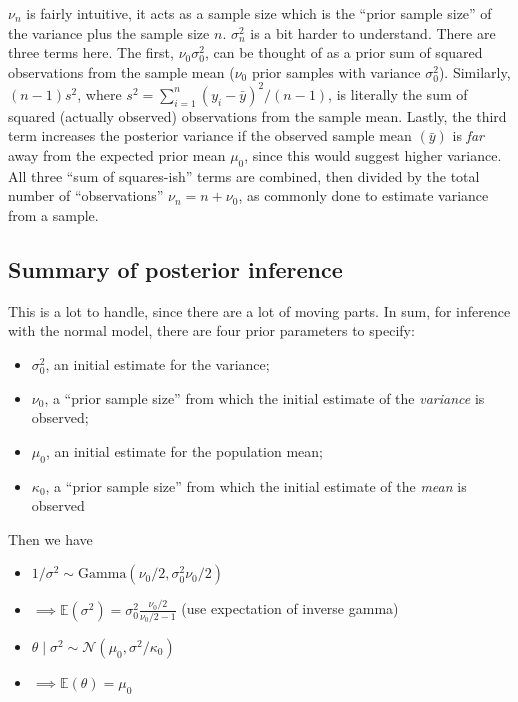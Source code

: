 \documentclass[]{article}
\providecommand{\tightlist}{%
  \setlength{\itemsep}{0pt}\setlength{\parskip}{0pt}}
\begin{document}
\(\nu_n\) is fairly intuitive, it acts as a sample size which is the
``prior sample size'' of the variance plus the sample size \(n\).
\(\sigma_n^2\) is a bit harder to understand. There are three terms
here. The first, \(\nu_0 \sigma_0^2\), can be thought of as a prior sum
of squared observations from the sample mean (\(\nu_0\) prior samples
with variance \(\sigma_0^2\)). Similarly, \((n - 1)s^2\), where
\(s^2 = \sum_{i = 1}^n (y_i - \bar{y})^2 / (n - 1)\), is literally the
sum of squared (actually observed) observations from the sample mean.
Lastly, the third term increases the posterior variance if the observed
sample mean \((\bar{y})\) is \emph{far} away from the expected prior
mean \(\mu_0\), since this would suggest higher variance. All three
``sum of squares-ish'' terms are combined, then divided by the total
number of ``observations'' \(\nu_n = n + \nu_0\), as commonly done to
estimate variance from a sample.

\hypertarget{summary-of-posterior-inference}{%
\subsection{Summary of posterior
inference}\label{summary-of-posterior-inference}}

This is a lot to handle, since there are a lot of moving parts. In sum,
for inference with the normal model, there are four prior parameters to
specify:

\begin{itemize}
\tightlist
\item
  \(\sigma_0^2\), an initial estimate for the variance;
\item
  \(\nu_0\), a ``prior sample size'' from which the initial estimate of
  the \emph{variance} is observed;
\item
  \(\mu_0\), an initial estimate for the population mean;
\item
  \(\kappa_0\), a ``prior sample size'' from which the initial estimate
  of the \emph{mean} is observed
\end{itemize}

Then we have

\begin{itemize}
\tightlist
\item
  \(1 / \sigma^2 \sim \text{Gamma}(\nu_0 / 2, \sigma^2_0 \nu_0 / 2)\)
\item
  \(\implies \mathbb{E}(\sigma^2) = \sigma^2_0 \frac{\nu_0 / 2}{\nu_0 / 2 - 1}\)
  (use expectation of inverse gamma)
\item
  \(\theta \mid \sigma^2 \sim \mathcal{N}(\mu_0, \sigma^2 / \kappa_0)\)
\item
  \(\implies \mathbb{E}(\theta) = \mu_0\)
\end{itemize}
\end{document}
